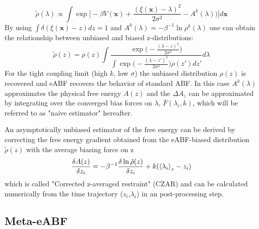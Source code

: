 \begin{equation}
  \tilde{\rho}(\lambda) \propto \int \exp \biggl[-\beta V(\textbf{x})+\frac{(\xi(\textbf{x})-\lambda)^2}{2\sigma^2} - A^{k}(\lambda) \biggr) \biggr] d\textbf{x}
\end{equation}
By using $\int \delta(\xi(\textbf{x})-z)dz=1$ and $A^k(\lambda)=-\beta^{-1}\ln\rho^k(\lambda)$ one can obtain the relationship between unbiased and biased z-distributions:
\begin{equation}
  \tilde{\rho}(z) =  \rho(z) \int \frac{\exp \bigl(-\frac{(\lambda-z)^2}{2\sigma^2}\bigr)}
  {\int \exp\bigl(-\frac{(\lambda-z')^2}{2\sigma^2}\bigr)\rho(z')dz'} d\lambda
\end{equation}
For the tight coupling limit (high $k$, low $\sigma$) the unbiased distribution $\rho(z)$ is recovered and eABF recovers the behavior of standard ABF. In this case $A^k(\lambda)$  approximates the physical free energy $A(z)$ and the $\Delta A_{z}$ can be approximated by integrating over the converged bias forces on $\lambda$, $\overline{F}(\lambda_{i}, k)$, which will be referred to as "naive estimator" hereafter.

An asymptotically unbiased estimator of the free energy can be derived by correcting the free energy gradient obtained from the eABF-biased distribution $\tilde{\rho}(z)$ with the average biasing force on z
\begin{equation}
  \frac{\delta A(z)}{\delta z_i} = -\beta^{-1}\frac{\delta \ln \tilde{\rho}(z)}{\delta z_i} + k(\braket{\lambda_i}_{z}-z_{i})
\end{equation}
which is called "Corrected z-averaged restraint" (CZAR) and can be calculated numerically from the time trajectory ($z_i$,$\lambda_i$) in an post-processing step.\autocite{lesage2017smoothed}

\subsection{Meta-eABF}
\label{sec:meta-eABF}
